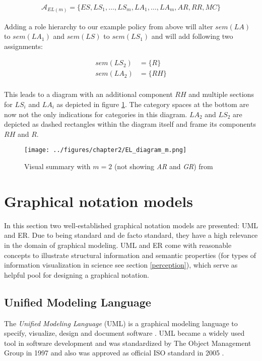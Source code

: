 \documentclass[twoside, openright, 12pt]{book}
\begin{document}
\begin{align*}
\mathcal{A}_{EL(m)} = \lbrace ES,LS_1, \dots,LS_m, LA_1, \dots, LA_m,AR,RR,MC\rbrace
\end{align*}

\noindent
Adding a role hierarchy to our example policy from above will alter $sem(LA)$ to $sem(LA_1)$ and $sem(LS)$ to $sem(LS_1)$ and will add following two assignments:

\begin{align*}
sem(LS_2) &= \lbrace R \rbrace\\
sem(LA_2) &= \lbrace RH \rbrace\\
\end{align*}

\noindent
This leads to a diagram with an additional component $RH$ and multiple sections for $LS_i$ and $LA_i$ as depicted in figure \ref{fig:EL_diagram_m}.
The category spaces at the bottom are now not the only indications for categories in this diagram.
$LA_2$ and $LS_2$ are depicted as dashed rectangles within the diagram itself and frame its components $RH$ and $R$.

\begin{figure}[htb]
	\centering
	\texttt{[image: ../figures/chapter2/EL\_diagram\_m.png]}
	\caption{Visual summary with $m=2$ (not showing \textit{AR} and \textit{GR}) from \cite[p.79, figure 4.4]{Amthor18}}
	\label{fig:EL_diagram_m}
\end{figure}



\section{Graphical notation models}
\label{graphical_notations}
In this section two well-established graphical notation models are presented: UML and ER.
Due to being standard and de facto standard, they have a high relevance in the domain of graphical modeling. 
UML and ER come with reasonable concepts to illustrate structural information and semantic properties (for types of information visualization in science see section \ref{perception}), which serve as helpful pool for designing a graphical notation.

\subsection{Unified Modeling Language}
\label{UML}
The \textit{Unified Modeling Language} (UML) is a graphical modeling language to specify, visualize, design and document software \citep{UML_OMG}.
UML became a widely used tool in software development and was standardized by The Object Management Group in 1997 and also was approved as official ISO standard in 2005 \citep{UML_ISO}.
\end{document}
